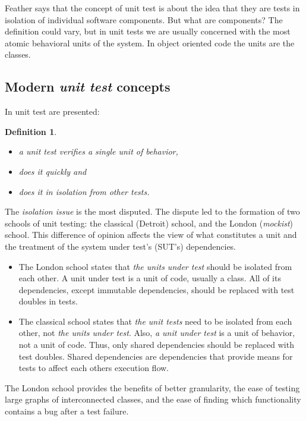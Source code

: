 \documentclass{article}
\newtheorem{definition}{Definition}
\begin{document}
Feather \cite{FeathersMichael} says that the concept of unit test is about the idea that they are tests in isolation of individual software components. But what are components? The definition could vary, but in unit tests we are usually concerned with the most atomic behavioral units of the system. In object oriented code the units are the classes.


\subsection{Modern \textit{unit test} concepts}

In \cite{Khoricov2020} unit test are presented:

\begin{definition}
\begin{itemize}
Unit tests are automatic tests having the following properties:
	\item a unit test verifies a single unit of behavior,
	\item does it quickly and
	\item does it in isolation from other tests.
\end{itemize}
\end{definition}


The \textit{isolation issue} is the most disputed. The dispute led to the formation of two schools of unit testing: the classical (Detroit) school, and the London (\textit{mockist}) school. This difference of opinion affects the view of what constitutes a unit and the treatment of the system under test’s (SUT’s) dependencies.

\begin{itemize}
	\item The London school states that \textit{the units under test} should be isolated from each other. A unit under test is a unit of code, usually a class. All of its dependencies, except immutable dependencies, should be replaced with test doubles in tests.
	\item The classical school states that \textit{the unit tests} need to be isolated from each other, not \textit{the units under test}. Also, \textit{a unit under test} is a unit of behavior, not a unit of code. Thus, only shared dependencies should be replaced with test doubles. Shared dependencies are dependencies that provide means for tests to affect each others execution flow.
\end{itemize}

The London school provides the benefits of better granularity, the ease of testing large graphs of interconnected classes, and the ease of finding which functionality contains a bug after a test failure.
\end{document}
